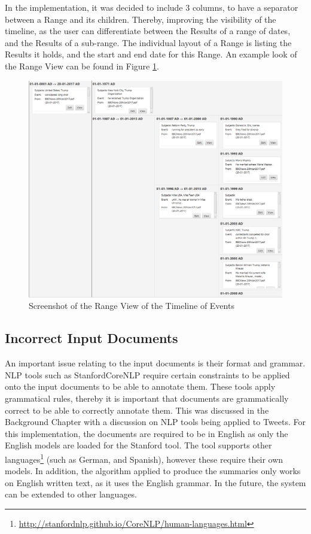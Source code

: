 \par In the implementation, it was decided to include 3 columns, to have a separator between a Range and its children. Thereby, improving the visibility of the timeline, as the user can differentiate between the Results of a range of dates, and the Results of a sub-range. The individual layout of a Range is listing the Results it holds, and the start and end date for this Range. An example look of the Range View can be found in Figure \ref{fig:rangeView}.

\begin{figure}[H]
\caption{Screenshot of the Range View of the Timeline of Events}
\label{fig:rangeView}
\includegraphics[scale=0.5]{rangeView.png}
\centering
\end{figure}
\subsection{Incorrect Input Documents}

\par An important issue relating to the input documents is their format and grammar. NLP tools such as StanfordCoreNLP require certain constraints to be applied onto the input documents to be able to annotate them. These tools apply grammatical rules, thereby it is important that documents are grammatically correct to be able to correctly annotate them. This was discussed in the Background Chapter with a discussion on NLP tools being applied to Tweets. For this implementation, the documents are required to be in English as only the English models are loaded for the Stanford tool. The tool supports other languages\footnote{\url{http://stanfordnlp.github.io/CoreNLP/human-languages.html}} (such as German, and Spanish), however these require their own models. In addition, the algorithm applied to produce the summaries only works on English written text, as it uses the English grammar. In the future, the system can be extended to other languages.

